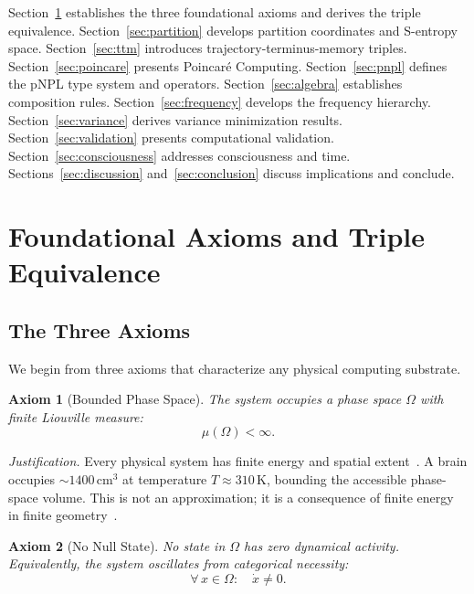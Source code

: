 \documentclass[10pt,twocolumn]{article}
\newtheorem{axiom}{Axiom}
\theoremstyle{remark}
\begin{document}
Section~\ref{sec:axioms} establishes the three foundational axioms and derives the triple equivalence. Section~\ref{sec:partition} develops partition coordinates and S-entropy space. Section~\ref{sec:ttm} introduces trajectory-terminus-memory triples. Section~\ref{sec:poincare} presents Poincar\'{e} Computing. Section~\ref{sec:pnpl} defines the pNPL type system and operators. Section~\ref{sec:algebra} establishes composition rules. Section~\ref{sec:frequency} develops the frequency hierarchy. Section~\ref{sec:variance} derives variance minimization results. Section~\ref{sec:validation} presents computational validation. Section~\ref{sec:consciousness} addresses consciousness and time. Sections~\ref{sec:discussion} and~\ref{sec:conclusion} discuss implications and conclude.

\section{Foundational Axioms and Triple Equivalence}
\label{sec:axioms}

\subsection{The Three Axioms}

We begin from three axioms that characterize any physical computing substrate.

\begin{axiom}[Bounded Phase Space]
\label{ax:bounded}
The system occupies a phase space $\Omega$ with finite Liouville measure:
\begin{equation}
\mu(\Omega) < \infty.
\label{eq:bounded}
\end{equation}
\end{axiom}

\noindent\textit{Justification.} Every physical system has finite energy and spatial extent~\cite{callen1985thermodynamics,landau1980statistical}. A brain occupies $\sim 1400\,\text{cm}^3$ at temperature $T \approx 310\,\text{K}$, bounding the accessible phase-space volume. This is not an approximation; it is a consequence of finite energy in finite geometry~\cite{jaynes2003probability}.

\begin{axiom}[No Null State]
\label{ax:nonull}
No state in $\Omega$ has zero dynamical activity. Equivalently, the system oscillates from categorical necessity:
\begin{equation}
\forall\, x \in \Omega: \quad \dot{x} \neq 0.
\label{eq:nonull}
\end{equation}
\end{axiom}
\end{document}
